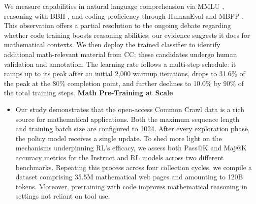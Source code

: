 \begin{algorithm}[t]
\begin{algorithmic}[1]
\begin{itemize}[topsep=0pt]
We measure capabilities in natural language comprehension via MMLU \citep{mmlu}, reasoning with BBH \citep{bbh}, and coding proficiency through HumanEval \citep{codex} and MBPP \citep{mbpp}. This observation offers a partial resolution to the ongoing debate regarding whether code training boosts reasoning abilities; our evidence suggests it does for mathematical contexts. We then deploy the trained classifier to identify additional math-relevant material from CC; these candidates undergo human validation and annotation. The learning rate follows a multi-step schedule: it ramps up to its peak after an initial 2,000 warmup iterations, drops to 31.6\% of the peak at the 80\% completion point, and further declines to 10.0\% by 90\% of the total training steps. \textbf{Math Pre-Training at Scale}

\begin{itemize}[topsep=0pt]
    \item Our study demonstrates that the open-access Common Crawl data is a rich source for mathematical applications. Both the maximum sequence length and training batch size are configured to 1024. After every exploration phase, the policy model receives a single update. To shed more light on the mechanisms underpinning RL’s efficacy, we assess both Pass@K and Maj@K accuracy metrics for the Instruct and RL models across two different benchmarks. Repeating this process across four collection cycles, we compile a dataset comprising 35.5M mathematical web pages and amounting to 120B tokens. Moreover, pretraining with code improves mathematical reasoning in settings not reliant on tool use. \end{itemize}


\end{itemize}
\end{algorithmic}
\end{algorithm}
